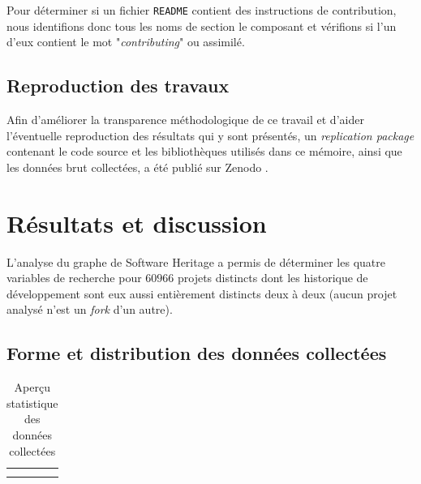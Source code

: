 \documentclass[dvipsnames]{llncs}
\newcommand{\en}[1]{\foreignlanguage{english}{\emph{#1}}}
\begin{document}
    Pour déterminer si un fichier \texttt{README} contient des instructions de contribution, nous identifions
    donc tous les noms de section le composant et vérifions si l'un d'eux contient le mot "\en{contributing}"
    ou assimilé.

    \subsection{Reproduction des travaux}

    Afin d'améliorer la transparence méthodologique de ce travail et d'aider l'éventuelle reproduction des
    résultats qui y sont présentés, un \en{replication package} contenant le code source et les bibliothèques
    utilisés dans ce mémoire, ainsi que les données brut collectées, a été publié sur Zenodo
    \parencite{replication-package}.

    \section{Résultats et discussion}

    \captionsetup[figure]{format=plain,singlelinecheck=true,justification=centering}
    \captionsetup[subfigure]{format=plain,singlelinecheck=true,justification=centering}
    \captionsetup[table]{format=plain,singlelinecheck=true,justification=centering}

    L'analyse du graphe de Software Heritage a permis de déterminer les quatre variables de recherche pour
    $60 966$ projets distincts dont les historique de développement sont eux aussi entièrement distincts deux
    à deux (aucun projet analysé n'est un \en{fork} d'un autre).

    \subsection{Forme et distribution des données collectées}

    \begin{table}[ht]
        \centering
        \begin{tabular}{cc}
             &
            
            \\
             &
            
        \end{tabular}
        \caption{Aperçu statistique des données collectées}
        \label{tab:data_description}
    \end{table}
\end{document}
